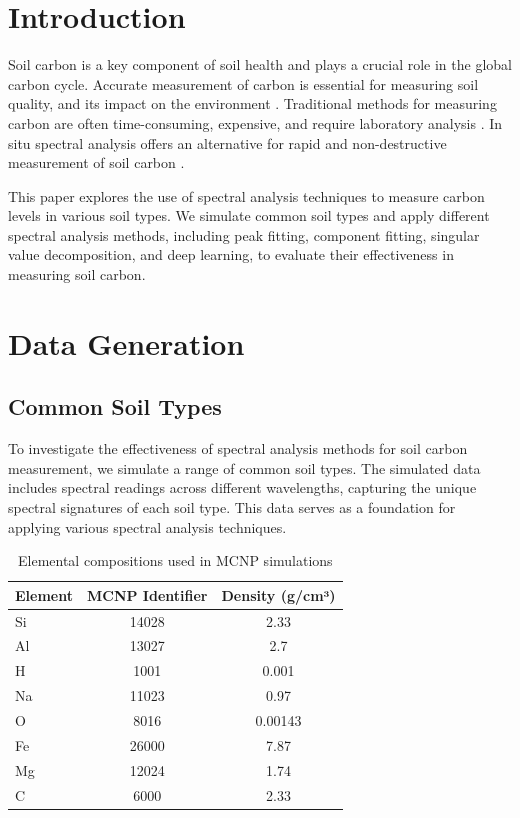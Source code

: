 \documentclass[review]{elsarticle}
\begin{document}
\section{Introduction}

Soil carbon is a key component of soil health and plays a crucial role in the global carbon cycle. Accurate measurement of carbon is essential for measuring soil quality, and its impact on the environment \cite{lal_soil_2018}. Traditional methods for measuring carbon are often time-consuming, expensive, and require laboratory analysis \cite{de_ros_advancing_2025}. In situ spectral analysis offers an alternative for rapid and non-destructive measurement of soil carbon \cite{yakubova_tagged_2019}.

This paper explores the use of spectral analysis techniques to measure carbon levels in various soil types. We simulate common soil types and apply different spectral analysis methods, including peak fitting, component fitting, singular value decomposition, and deep learning, to evaluate their effectiveness in measuring soil carbon.

\section{Data Generation}

\subsection{Common Soil Types}

To investigate the effectiveness of spectral analysis methods for soil carbon measurement, we simulate a range of common soil types. The simulated data includes spectral readings across different wavelengths, capturing the unique spectral signatures of each soil type. This data serves as a foundation for applying various spectral analysis techniques.

\begin{table}[H]
\centering
\caption{Elemental compositions used in MCNP simulations}
\label{tab:elements}
\begin{tabular}{lcc}
\toprule
Element & MCNP Identifier & Density (g/cm³) \\
\midrule
Si & 14028 & 2.33 \\
Al & 13027 & 2.7 \\
H & 1001 & 0.001 \\
Na & 11023 & 0.97 \\
O & 8016 & 0.00143 \\
Fe & 26000 & 7.87 \\
Mg & 12024 & 1.74 \\
C & 6000 & 2.33 \\
\bottomrule
\end{tabular}
\end{table}
\end{document}
